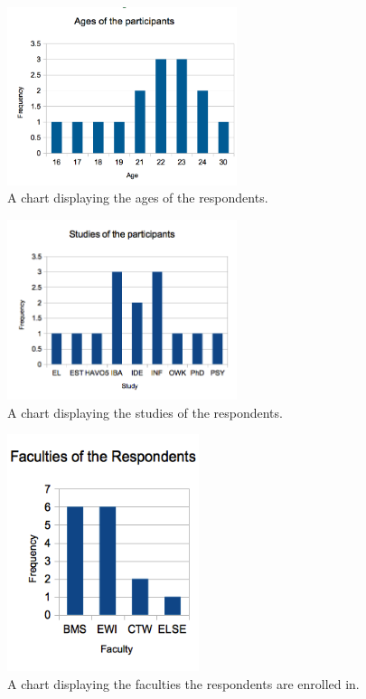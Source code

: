 \documentclass[11pt,twoside]{report} %
\begin{document}
\begin{figure}[htb!]
\centering
\includegraphics[width=0.6\textwidth]{ageschart}
\caption{A chart displaying the ages of the respondents.}
\label{fig:ageschart}
\end{figure}

\begin{figure}[htb!]
\centering
\includegraphics[width=0.6\textwidth]{studieschart}
\caption{A chart displaying the studies of the respondents.}
\label{fig:studieschart}
\end{figure}

\begin{figure}[htb!]
\centering
\includegraphics[width=0.5\textwidth]{facultieschart}
\caption{A chart displaying the faculties the respondents are enrolled in.}
\label{fig:facultieschart}
\end{figure}
\end{document}
